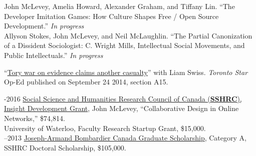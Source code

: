 \documentclass[9pt,usenames,dvipsnames]{article}
\begin{document}
\ind John McLevey, Amelia Howard, Alexander Graham, and Tiffany Lin. ``The Developer Imitation Games: How Culture Shapes Free / Open Source Development.'' \emph{In progress}\\

\ind Allyson Stokes, John McLevey, and Neil McLaughlin. ``The Partial Canonization of a Dissident Sociologist: C. Wright Mills, Intellectual Social Movements, and Public Intellectuals.'' \emph{In progress}\\ %





\ind ``\href{http://bit.ly/1ohSn1N}{Tory war on evidence claims another casualty}'' with Liam Swiss. \emph{Toronto Star} Op-Ed published on September 24 2014, section A15. \\ 


-2016 \href{http://www.sshrc-crsh.gc.ca/funding-financement/programs-programmes/insight_development_grants-su
bventions_de_developpement_savoir-eng.aspx}{Social Science and Humanities Research Council of Canada (\textbf{SSHRC}), Insight Development Grant}, John McLevey, ``Collaborative Design in Online Networks,'' \$74,814. \\

 University of Waterloo, Faculty Research Startup Grant, \$15,000. \\

–2013 \href{http://www.sshrc-crsh.gc.ca/funding-financement/programs-programmes/fellowships/doctoral-doctorat-eng.aspx}{Joseph-Armand Bombardier Canada Graduate Scholarship}, Category A, SSHRC Doctoral Scholarship, \$105,000.\\
\end{document}
